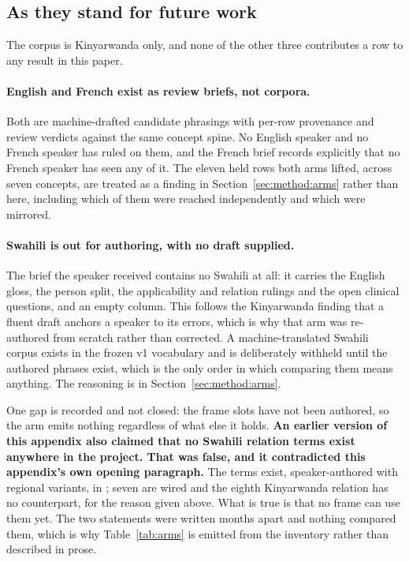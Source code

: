 \subsection{As they stand for future work}

The corpus is Kinyarwanda only, and none of the other three contributes a row to
any result in this paper.

\paragraph{English and French exist as review briefs, not corpora.} Both are
machine-drafted candidate phrasings with per-row provenance and review verdicts
against the same concept spine. No English speaker and no French speaker has
ruled on them, and the French brief records explicitly that no French speaker has
seen any of it. The eleven held rows both arms lifted, across seven concepts,
are treated as a finding in Section~\ref{sec:method:arms} rather than here,
including which of them were reached independently and which were mirrored.

\paragraph{Swahili is out for authoring, with no draft supplied.} The brief the
speaker received contains no Swahili at all: it carries the English gloss, the
person split, the applicability and relation rulings and the open clinical
questions, and an empty column. This follows the Kinyarwanda finding that a
fluent draft anchors a speaker to its errors, which is why that arm was
re-authored from scratch rather than corrected. A machine-translated Swahili
corpus exists in the frozen v1 vocabulary and is deliberately withheld until the
authored phrases exist, which is the only order in which comparing them means
anything. The reasoning is in Section~\ref{sec:method:arms}.

One gap is recorded and not closed: the frame slots have not been authored, so
the arm emits nothing regardless of what else it holds. \textbf{An earlier
version of this appendix also claimed that no Swahili relation terms exist
anywhere in the project. That was false, and it contradicted this appendix's own
opening paragraph.} The terms exist, speaker-authored with regional variants, in
; seven are wired and the eighth Kinyarwanda
relation has no counterpart, for the reason given above. What is true is that no
frame can use them yet. The two statements were written months apart and nothing
compared them, which is why Table~\ref{tab:arms} is emitted from the inventory
rather than described in prose.


